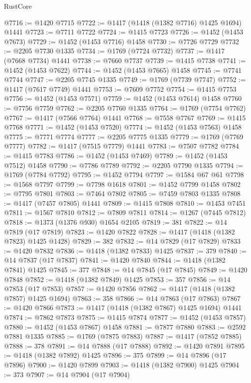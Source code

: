 \begin{lexlean}{RustCore}
\begin{coremodule}
@7716 := @1420 @7715
@7722 := @1417 (@1418 (@1382 @7716) @1425 @1694) @1441
@7723 := @7711 @7722
@7724 := @1415 @7723
@7726 := @1452 (@1453 @7673)
@7729 := @1452 (@1453 @7716) @1458
@7730 := @7726 @7729
@7732 := @2205 @7730 @1335
@7734 := @1769 (@7724 @7732)
@7737 := @1417 (@7668 @7734) @1441
@7738 := @7660 @7737
@7739 := @1415 @7738
@7741 := @1452 (@1453 @7622)
@7744 := @1452 (@1453 @7665) @1458
@7745 := @7741 @7744
@7747 := @2205 @7745 @1335
@7749 := @1769 (@7739 @7747)
@7752 := @1417 (@7617 @7749) @1441
@7753 := @7609 @7752
@7754 := @1415 @7753
@7756 := @1452 (@1453 @7571)
@7759 := @1452 (@1453 @7614) @1458
@7760 := @7756 @7759
@7762 := @2205 @7760 @1335
@7764 := @1769 (@7754 @7762)
@7767 := @1417 (@7566 @7764) @1441
@7768 := @7558 @7767
@7769 := @1415 @7768
@7771 := @1452 (@1453 @7520)
@7774 := @1452 (@1453 @7563) @1458
@7775 := @7771 @7774
@7777 := @2205 @7775 @1335
@7779 := @1769 (@7769 @7777)
@7782 := @1417 (@7515 @7779) @1441
@7783 := @7507 @7782
@7784 := @1415 @7783
@7786 := @1452 (@1453 @7469)
@7789 := @1452 (@1453 @7512) @1458
@7790 := @7786 @7789
@7792 := @2205 @7790 @1335
@7794 := @1769 (@7784 @7792)
@7795 := @1452 @7794
@7797 := @1584 @67 @61
@7798 := @1568 @7797
@7799 := @7798 @1618
@7801 := @1452 @7799 @1458
@7802 := @7795 @7801
@7803 := @7464 @7802
@7805 := @7459 @7803 @1335
@7808 := @1417 (@7457 @7805) @1441
@7809 := @1415 @7808
@7810 := @1453 @7451
@7811 := @1567 @7810
@7812 := @7809 @7811
@7814 := @1267 (@7445 @7812)
@7818 := @1373 (@1376 @930) @1654 @2105
@7819 := 381
@7822 := @14 @7819 (@17 @7819)
@7823 := @1420 @7822
@7828 := @1417 (@1418 (@1382 @7823) @1425 @1428)
@7829 := 382
@7832 := @14 @7829 (@17 @7829)
@7833 := @1420 @7832
@7836 := @1418 (@1382 @7833) @1425
@7837 := 379
@7840 := @14 @7837 (@17 @7837)
@7841 := @1420 @7840
@7844 := @1418 (@1382 @7841) @1425
@7845 := 377
@7848 := @14 @7845 (@17 @7845)
@7849 := @1420 @7848
@7852 := @1418 (@1382 @7849) @1425
@7853 := 357
@7856 := @14 @7853 (@17 @7853)
@7857 := @1420 @7856
@7862 := @1417 (@1418 (@1382 @7857) @1425 @1694)
@7863 := 358
@7866 := @14 @7863 (@17 @7863)
@7867 := @1420 @7866
@7873 := @1417 (@1418 (@1382 @7867) @1425 @1694) @1441
@7874 := @7862 @7873
@7875 := @1415 @7874
@7877 := @1452 (@1453 @7857)
@7880 := @1452 (@1453 @7867) @1458
@7881 := @7877 @7880
@7883 := @2592 @7881 @1335
@7885 := @1769 (@7875 @7883)
@7887 := @1417 (@7852 @7885)
@7888 := 378
@7891 := @14 @7888 (@17 @7888)
@7892 := @1420 @7891
@7895 := @1418 (@1382 @7892) @1425
@7896 := 375
@7899 := @14 @7896 (@17 @7896)
@7900 := @1420 @7899
@7903 := @1418 (@1382 @7900) @1425
@7904 := 373
@7907 := @14 @7904 (@17 @7904)

\end{coremodule}
\end{lexlean}
